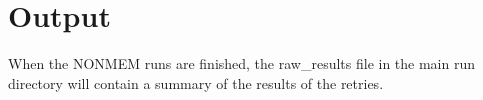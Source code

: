 \section{Output}
When the NONMEM runs are finished, the raw\_results file in the
main run directory will contain a summary of the results of the 
retries.




